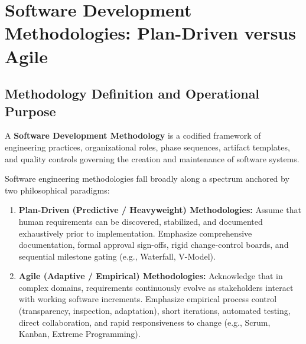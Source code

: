 \section{Software Development Methodologies: Plan-Driven versus Agile}
\label{sec:se_methodologies}

\subsection{Methodology Definition and Operational Purpose}
A \textbf{Software Development Methodology} is a codified framework of engineering practices, organizational roles, phase sequences, artifact templates, and quality controls governing the creation and maintenance of software systems. 

Software engineering methodologies fall broadly along a spectrum anchored by two philosophical paradigms:
\begin{enumerate}
    \item \textbf{Plan-Driven (Predictive / Heavyweight) Methodologies:} Assume that human requirements can be discovered, stabilized, and documented exhaustively prior to implementation. Emphasize comprehensive documentation, formal approval sign-offs, rigid change-control boards, and sequential milestone gating (e.g., Waterfall, V-Model).
    \item \textbf{Agile (Adaptive / Empirical) Methodologies:} Acknowledge that in complex domains, requirements continuously evolve as stakeholders interact with working software increments. Emphasize empirical process control (transparency, inspection, adaptation), short iterations, automated testing, direct collaboration, and rapid responsiveness to change (e.g., Scrum, Kanban, Extreme Programming).
\end{enumerate}

